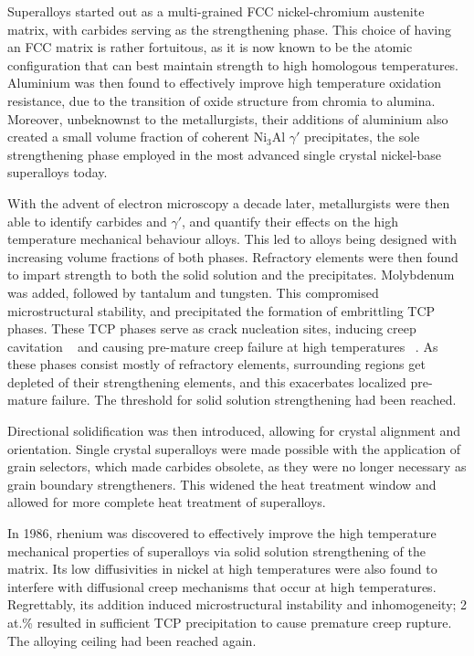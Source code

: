 %
Superalloys started out as a multi-grained FCC nickel-chromium austenite matrix, with carbides serving as the strengthening phase. This choice of having an FCC matrix is rather fortuitous, as it is now known to be the atomic configuration that can best maintain strength to high homologous temperatures. Aluminium was then found to effectively improve high temperature oxidation resistance, due to the transition of oxide structure from chromia to alumina. Moreover, unbeknownst to the metallurgists, their additions of aluminium also created a small volume fraction of coherent Ni$_3$Al $\gamma'$ precipitates, the sole strengthening phase employed in the most advanced single crystal nickel-base superalloys today. 

With the advent of electron microscopy a decade later, metallurgists were then able to identify carbides and $\gamma'$, and quantify their effects on the high temperature mechanical behaviour alloys. This led to alloys being designed with increasing volume fractions of both phases.  Refractory elements were then found to impart strength to both the solid solution and the precipitates.  Molybdenum was added, followed by tantalum and tungsten. This compromised microstructural stability, and precipitated the formation of embrittling TCP phases. These TCP phases serve as crack nucleation sites, inducing creep cavitation ~\cite{reed99} and causing pre-mature creep failure at high temperatures ~\cite{yeh04}.  As these phases consist mostly of refractory elements, surrounding regions get depleted of their strengthening elements, and this exacerbates localized pre-mature failure. The threshold for solid solution strengthening had been reached.  

Directional solidification was then introduced, allowing for crystal alignment and orientation.  Single crystal superalloys were made possible with the application of grain selectors, which made carbides obsolete, as they were no longer necessary as grain boundary strengtheners.  This widened the heat treatment window and allowed for more complete heat treatment of superalloys.  

In 1986, rhenium was discovered to effectively improve the high temperature mechanical properties of superalloys via solid solution strengthening of the matrix.  Its low diffusivities in nickel at high temperatures were also found to interfere with diffusional creep mechanisms that occur at high temperatures.  Regrettably, its addition induced microstructural instability and inhomogeneity; 2 at.\% resulted in sufficient TCP precipitation to cause premature creep rupture. The alloying ceiling had been reached again.  

